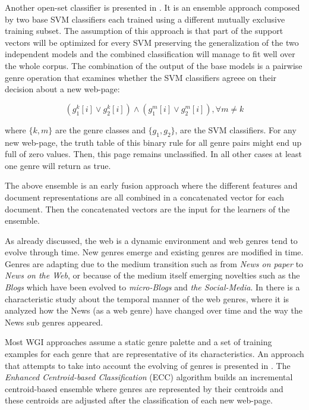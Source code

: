 Another open-set classifier is presented in \parencite{chen2012genre}. It is an ensemble approach composed by two base SVM classifiers each trained using a different mutually exclusive training subset. The assumption of this approach is that part of the support vectors will be optimized for every SVM preserving the generalization of the two independent models and the combined classification will manage to fit well over the whole corpus. The combination of the output of the base models is a pairwise genre operation that examines whether the SVM classifiers agreee on their decision about a new web-page:

\begin{equation}\label{eq:office_doc_ensemble}
	(g^{k}_{1}[i] \vee g^{k}_{2}[i])  \wedge  (g^{m}_{1}[i] \vee g^{m}_{2}[i]) ,   \forall m \neq k
\end{equation}

where $\{k, m\}$ are the genre classes and $\{g_{1}, g_{2}\}$, are the SVM classifiers. For any new web-page, the truth table of this binary rule for all genre pairs might end up full of zero values. Then, this page remains unclassified. In all other cases at least one genre will return as true. 
		
The above ensemble is an early fusion approach where the different features and document representations are all combined in a concatenated vector for each document. Then the concatenated vectors are the input for the learners of the ensemble.

As already discussed, the web is a dynamic environment and web genres tend to evolve through time. New genres  emerge and existing genres are modified in time. Genres are adapting due to the medium transition such as from \textit{News on paper} to \textit{News on the Web}, or because of the medium itself emerging novelties such as the \textit{Blogs} which have been evolved to \textit{micro-Blogs} and \textit{the Social-Media}. In \parencite{caple2017genre} there is a characteristic study about the temporal manner of the web genres, where it is analyzed how the News (as a web genre) have changed over time and the way the News sub genres appeared.

Most WGI approaches assume a static genre palette and a set of training examples for each genre that are representative of its characteristics. An approach that attempts to take into account the evolving of genres is presented in \parencite{jebari2015combination}. The \textit{Enhanced Centroid-based Classification} (ECC) algorithm builds an incremental centroid-based ensemble where genres are represented by their centroids and these centroids are adjusted after the classification of each new web-page.


